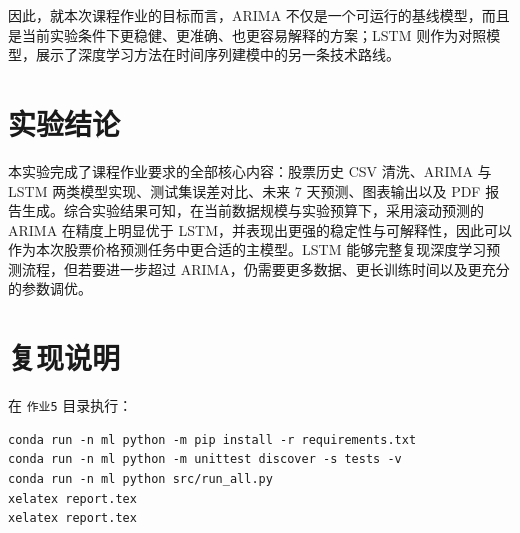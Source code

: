 \documentclass[UTF8,a4paper,12pt]{ctexart}
\begin{document}
因此，就本次课程作业的目标而言，ARIMA 不仅是一个可运行的基线模型，而且是当前实验条件下更稳健、更准确、也更容易解释的方案；LSTM 则作为对照模型，展示了深度学习方法在时间序列建模中的另一条技术路线。

\section{实验结论}
本实验完成了课程作业要求的全部核心内容：股票历史 CSV 清洗、ARIMA 与 LSTM 两类模型实现、测试集误差对比、未来 7 天预测、图表输出以及 PDF 报告生成。综合实验结果可知，在当前数据规模与实验预算下，采用滚动预测的 ARIMA 在精度上明显优于 LSTM，并表现出更强的稳定性与可解释性，因此可以作为本次股票价格预测任务中更合适的主模型。LSTM 能够完整复现深度学习预测流程，但若要进一步超过 ARIMA，仍需要更多数据、更长训练时间以及更充分的参数调优。

\section{复现说明}
在 \texttt{作业5} 目录执行：
\begin{verbatim}
conda run -n ml python -m pip install -r requirements.txt
conda run -n ml python -m unittest discover -s tests -v
conda run -n ml python src/run_all.py
xelatex report.tex
xelatex report.tex
\end{verbatim}
\end{document}

